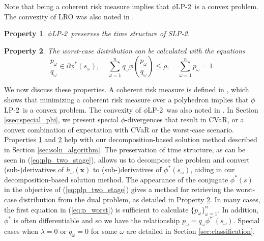 \documentclass[opre,nonblindrev]{informs3} %
\newcommand{\x}{\mathbf{x}}
\newtheorem{property}{Property}
\newcommand{\plp}{$\phi$LP-2}
\begin{document}
Note that being a coherent risk measure implies that \plp\ is a convex problem.
The convexity of LRO was also noted in \cite{wang2010likelihood}.

\begin{property}
	\label{property:time_structure}
	\plp\ preserves the time structure of SLP-2.
\end{property}

\begin{property}
	\label{property:primal_dual_relation}
	The worst-case distribution can be calculated with the equations
	\begin{equation}\label{eq:p_worst}
		\frac{p_\omega}{q_\omega} \in \partial \phi^*\left(s_\omega\right), \ \ \ \ \ \sum_{\omega=1}^n q_\omega \phi\left(\frac{p_\omega}{q_\omega}\right) \leq \rho, \ \ \ \ \ \sum_{\omega=1}^n p_\omega = 1.
	\end{equation}		
\end{property}

We now discuss these properties. A coherent risk measure is defined in \citep{rockafellar2007coherent}, which shows that minimizing a coherent risk measure over a polyhedron implies that \plp\ is a convex problem.
The convexity of \plp\ was also noted in \citep{bental2011robust}.
In Section \ref{ssec:special_phi}, we present special $\phi$-divergences that result in CVaR, or a convex combination of expectation with CVaR or the worst-case scenario. 
Properties \ref{property:time_structure} and \ref{property:primal_dual_relation} help with our decomposition-based solution method described in Section \ref{sec:soln_algorithm}. 
The preservation of time structure, as can be seen in (\ref{eq:plp_two_stage}), allows us to decompose the problem and convert (sub-)derivatives of $h_\omega(\x)$ to (sub-)derivatives of $\phi^*\left(s_\omega\right)$, aiding in our decomposition-based solution method. 
The appearance of the conjugate $\phi^*(s)$ in the objective of (\ref{eq:plp_two_stage}) gives a method for retrieving the worst-case distribution from the dual problem, as detailed in Property \ref{property:primal_dual_relation}.
In many cases, the first equation in (\ref{eq:p_worst}) is sufficient to calculate $\{p_\omega\}_{\omega=1}^n$.
In addition, $\phi^*$ is often differentiable and so we have the relationship $p_\omega = q_\omega \phi^{* \prime}(s_\omega)$.
Special cases when $\lambda = 0$ or $q_\omega = 0$ for some $\omega$ are detailed in Section \ref{sec:classification}.
\end{document}
